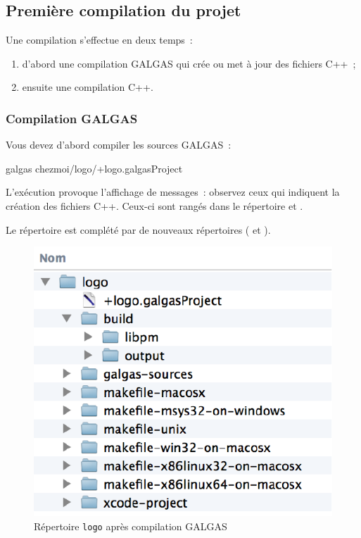 \subsection{Première compilation du projet}

Une compilation s'effectue en deux temps~:
\begin{enumerate}
  \item d'abord une compilation GALGAS qui crée ou met à jour des fichiers C++~;
  \item ensuite une compilation C++.
\end{enumerate}


\subsubsection{Compilation GALGAS}

Vous devez d'abord compiler les sources GALGAS~:
\begin{SHELL}
galgas chezmoi/logo/+logo.galgasProject
\end{SHELL}

L'exécution provoque l'affichage de messages~: observez ceux qui indiquent la création des fichiers C++. Ceux-ci sont rangés dans le répertoire  et .

Le répertoire  est complété par de nouveaux répertoires ( et ).
\begin{figure}[t]
  \centering
  \includegraphics{partie-utilisation/repertoire-logo.pdf}
  \caption{Répertoire \texttt{logo} après compilation GALGAS}
  \ligne
\end{figure}


